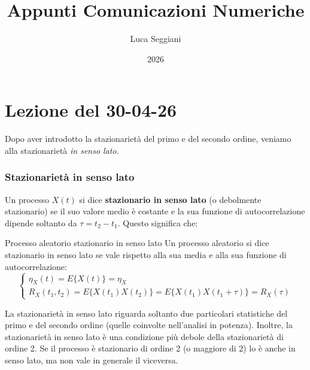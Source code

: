 \documentclass[a4paper,11pt]{article}
\title{Appunti Comunicazioni Numeriche}
\author{Luca Seggiani}
\date{2026}
\begin{document}
\section{Lezione del 30-04-26}

\thispagestyle{empty}
\pagestyle{fancy}

Dopo aver introdotto la stazionarietà del primo e del secondo ordine, veniamo alla stazionarietà \textit{in senso lato}.

\subsubsection{Stazionarietà in senso lato}
Un processo $X(t)$ si dice \textbf{stazionario in senso lato} (o debolmente stazionario) se il suo valore medio è costante e la sua funzione di autocorrelazione dipende soltanto da $\tau = t_2 - t_1$. Questo significa che:
\begin{definition}{Processo aleatorio stazionario in senso lato}
Un processo aleatorio si dice stazionario in senso lato se vale rispetto alla sua media e alla sua funzione di autocorrelazione:
$$
\begin{cases}
\eta_X(t) = E\{X(t)\} = \eta_X \\
R_X(t_1, t_2) = E\{X(t_1) X(t_2)\} = E\{X(t_1)X(t_1 + \tau)\} = R_X(\tau)
\end{cases}
$$
\end{definition}

La stazionarietà in senso lato riguarda soltanto due particolari statistiche del primo e del secondo ordine (quelle coinvolte nell’analisi in potenza). Inoltre, la stazionarietà in senso lato è una condizione più debole della stazionarietà di ordine 2. Se il processo è stazionario di ordine 2 (o maggiore di 2) lo è anche in senso lato, ma non vale in generale il viceversa.
\end{document}
